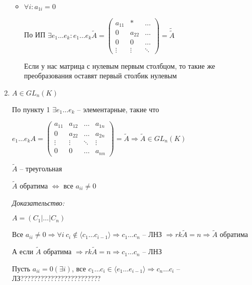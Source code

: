 \documentclass[12pt]{article}
\newcommand{\q}[1]{\langle #1 \rangle}
\begin{document}
\begin{enumerate}
\begin{itemize}
        \item $\forall i : a_{1i} = 0$
        
        По ИП $\exists e_1 \ldots e_k : e_1 \ldots e_k \tilde{A} = \begin{pmatrix}
            a_{11} & * & \ldots \\
            0 & a_{22} & \ldots \\
            0 & 0 & \ldots \\
            \vdots & \vdots & \ddots
        \end{pmatrix} = \tilde{\tilde{A}}$

        Если у нас матрица с нулевым первым столбцом, то такие же преобразования оставят первый столбик нулевым
    \end{itemize}

    \item $A \in GL_n(K)$
    
    По пункту 1 $\exists e_1 \ldots e_k$ -- элементарные, такие что

    $e_1 \ldots e_kA = \begin{pmatrix}
        a_{11} & a_{12} & \ldots & a_{1n} \\
        0 & a_{22} & \ldots & a_{2n} \\
        \vdots & \vdots & \ddots & \vdots \\
        0 & 0 & \ldots & a_{nn}
    \end{pmatrix} = \tilde{A} \Rightarrow \tilde{A} \in GL_n(K)$

    \begin{lem}{}
        $\tilde{A}$ -- треугольная

        $\tilde{A}$ обратима $\Leftrightarrow$ все $a_{ii} \neq 0$
    \end{lem}

    \textit{Доказательство:}

    $A = (C_1 | \ldots | C_n)$

    Все $a_{ii} \neq 0 \Rightarrow \forall i\ c_i \notin \q{c_1 \ldots c_{i - 1}} \Rightarrow c_1 \ldots c_n$ -- ЛНЗ $\Rightarrow rk\tilde{A} = n \Rightarrow \tilde{A}$ обратима

    А если $\tilde{A}$ обратима $\Rightarrow rk\tilde{A} = n \Rightarrow c_1 \ldots c_n$ -- ЛНЗ

    Пусть $a_{ii} = 0 (\exists i)$, все $c_1 \ldots c_i \in \q{e_1 \ldots e_{i - 1}} \Rightarrow c_n \ldots c_i$ -- ЛЗ???????????????????????? 

    \vspace{5mm}


\end{enumerate}
\end{document}
